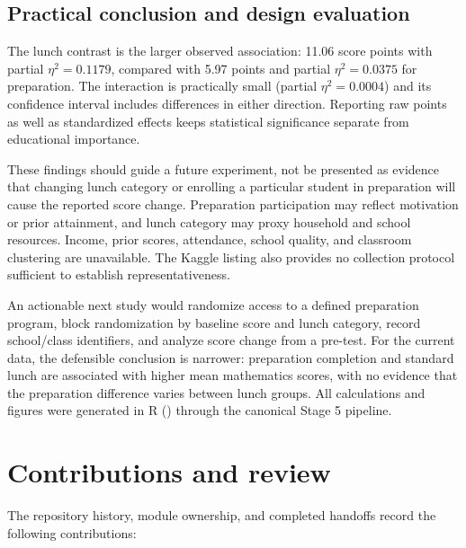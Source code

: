 \documentclass[
  10pt,
]{article}
\begin{document}
\subsection{Practical conclusion and design
evaluation}\label{practical-conclusion-and-design-evaluation}

The lunch contrast is the larger observed association: 11.06 score
points with partial \(\eta^2=0.1179\), compared with 5.97 points and
partial \(\eta^2=0.0375\) for preparation. The interaction is
practically small (partial \(\eta^2=0.0004\)) and its confidence
interval includes differences in either direction. Reporting raw points
as well as standardized effects keeps statistical significance separate
from educational importance.

These findings should guide a future experiment, not be presented as
evidence that changing lunch category or enrolling a particular student
in preparation will cause the reported score change. Preparation
participation may reflect motivation or prior attainment, and lunch
category may proxy household and school resources. Income, prior scores,
attendance, school quality, and classroom clustering are unavailable.
The Kaggle listing also provides no collection protocol sufficient to
establish representativeness.

An actionable next study would randomize access to a defined preparation
program, block randomization by baseline score and lunch category,
record school/class identifiers, and analyze score change from a
pre-test. For the current data, the defensible conclusion is narrower:
preparation completion and standard lunch are associated with higher
mean mathematics scores, with no evidence that the preparation
difference varies between lunch groups. All calculations and figures
were generated in R () through
the canonical Stage 5 pipeline.

\section{Contributions and review}\label{contributions-and-review}

The repository history, module ownership, and completed handoffs record
the following contributions:
\end{document}
